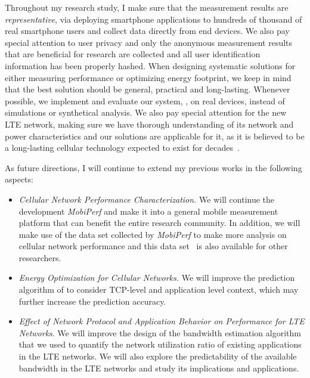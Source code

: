 Throughout my research study, I make sure that the measurement results are {\em representative}, \eg via deploying smartphone applications to hundreds of thousand of real smartphone users and collect data directly from end devices. We also pay special attention to user privacy and only the anonymous measurement results that are beneficial for research are collected and all user identification information has been properly hashed. When designing systematic solutions for either measuring performance or optimizing energy footprint, we keep in mind that the best solution should be general, practical and long-lasting. Whenever possible, we implement and evaluate our system, \eg \NAME, on real devices, instead of simulations or synthetical analysis. We also pay special attention for the new LTE network, making sure we have thorough understanding of its network and power characteristics and our solutions are applicable for it, as it is believed to be a long-lasting cellular technology expected to exist for decades~\cite{3gpp.lte}.


As future directions, I will continue to extend my previous works in the following aspects:
\begin{itemize}
\item \emph{Cellular Network Performance Characterization.} We will continue the development \emph{MobiPerf} and make it into a general mobile measurement platform that can benefit the entire research community. In addition, we will make use of the data set collected by \emph{MobiPerf} to make more analysis on cellular network performance and this data set~\cite{mobiperf.data} is also available for other researchers.
\item \emph{Energy Optimization for Cellular Networks.} We will improve the prediction algorithm of \NAME to consider TCP-level and application level context, which may further increase the prediction accuracy.
\item \emph{Effect of Network Protocol and Application Behavior on Performance for LTE Networks}. We will improve the design of the bandwidth estimation algorithm that we used to quantify the network utilization ratio of existing applications in the LTE networks. We will also explore the predictability of the available bandwidth in the LTE networks and study its implications and applications.
\end{itemize}
